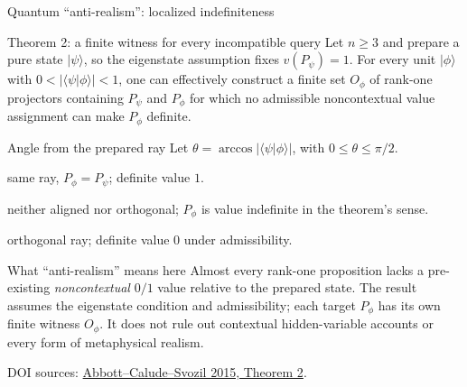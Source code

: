 \documentclass{beamer}
\newcommand{\doiref}[2]{%
  \href{https://doi.org/#1}{\textcolor{blue!65!black}{#2}}}
\newcommand{\sourcefoot}[1]{%
  \par\vfill{\tiny\color{black!60}DOI sources: #1\par}}
\begin{document}
\begin{frame}{Quantum ``anti-realism'': localized indefiniteness}
\footnotesize
\begin{block}{Theorem 2: a finite witness for every incompatible query}
Let $n\geq3$ and prepare a pure state $\lvert\psi\rangle$, so the eigenstate
assumption fixes $v(P_\psi)=1$. For every unit $\lvert\phi\rangle$ with
$0<\lvert\langle\psi\vert\phi\rangle\rvert<1$, one can effectively construct a
finite set $O_\phi$ of rank-one projectors containing $P_\psi$ and $P_\phi$ for
which no admissible noncontextual value assignment can make $P_\phi$ definite.
\end{block}

\begin{exampleblock}{Angle from the prepared ray}
Let $\theta=\arccos\lvert\langle\psi\vert\phi\rangle\rvert$, with
$0\leq\theta\leq\pi/2$.
\begin{description}
  \setlength{\itemsep}{0.3em}
  \item[$\theta=0$:] same ray, $P_\phi=P_\psi$; definite value $1$.
  \item[$0<\theta<\pi/2$:] neither aligned nor orthogonal; $P_\phi$ is value
        indefinite in the theorem's sense.
  \item[$\theta=\pi/2$:] orthogonal ray; definite value $0$ under admissibility.
\end{description}
\end{exampleblock}

\begin{alertblock}{What ``anti-realism'' means here}
Almost every rank-one proposition lacks a pre-existing \emph{noncontextual}
$0/1$ value relative to the prepared state. The result assumes the eigenstate
condition and admissibility; each target $P_\phi$ has its own finite witness
$O_\phi$. It does not rule out contextual hidden-variable accounts or every
form of metaphysical realism.
\end{alertblock}

\sourcefoot{\doiref{10.1063/1.4931658}{Abbott--Calude--Svozil 2015, Theorem 2}.}
\end{frame}
\end{document}
